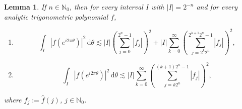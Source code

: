 \documentclass[a4paper, leqno, 10pt]{amsart}
\numberwithin{equation}{section}
\newtheorem{lemma}[thm]{Lemma}
\newcommand{\dd}{\mathrm{d}}
\newcommand{\brkt}[1]{\left(#1\right)}
\newcommand{\abs}[1]{\left|#1\right|}
\newcommand{\N}{\mathbb{N}}
\begin{document}
\begin{lemma}\label{lem:uncond1}
If $n \in \N_0$, %
then for every interval $I$ with $\abs{I}= 2^{-n}$ and for every analytic trigonometric polynomial $f$, 
\begin{enumerate}
%
\item \label{geometric}
\[    \int_I \left| f( e^{i 2 \pi \theta} ) \right|^2 \, \dd \theta \lesssim  \abs{I}  \brkt{\sum_{j=0}^{2^{n}-1} \abs{f_j}}^2 +
    \abs{I}  \sum_{k=0}^\infty \brkt{\sum_{j=2^k 2^n}^{2^{k+1} 2^{n}-1} \abs{f_j}}^2,
\]
\item \label{arithmetic}
\[    \int_I \left| f( e^{i 2 \pi \theta} ) \right|^2 \, \dd \theta \lesssim 
    \abs{I}  \sum_{k=0}^\infty \brkt{\sum_{j=k2^n}^{(k+1)2^{n}-1} \abs{f_j}}^2,
\]
\end{enumerate}
where $f_j := \widehat{f} (j)$, $j \in \N_0$. 
%
\end{lemma}
\end{document}
